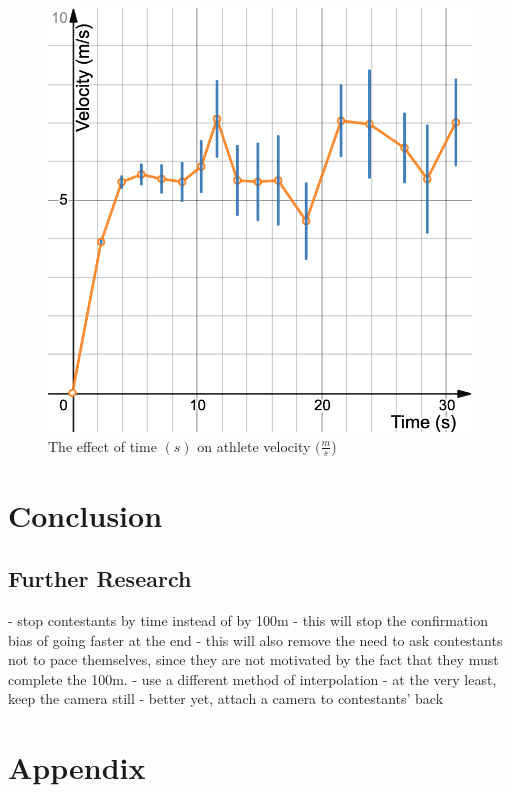 \documentclass[index]{subfiles}
\begin{document}
\begin{figure}[H]
    \centering
    \caption{The effect of time \((s)\) on athlete velocity \((\frac{m}{s}\))}
    \includegraphics[scale=0.3]{pics/velocity-time.png}
\end{figure}

\section{Conclusion}
\subsection{Further Research}
- stop contestants by time instead of by 100m
- this will stop the confirmation bias of going faster at the end
- this will also remove the need to ask contestants not to pace themselves, since they are not motivated by the fact that they must complete the 100m.
- use a different method of interpolation
- at the very least, keep the camera still
- better yet, attach a camera to contestants' back

\section{Appendix}
\end{document}
